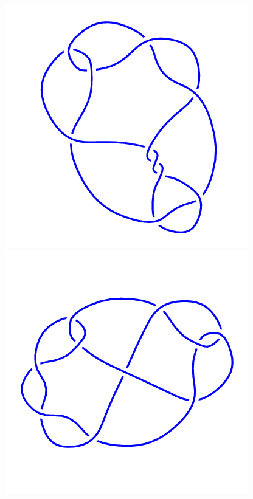 \begin{figure}[H]
    \begin{minipage}[b]{.18\linewidth}
        \centering
        \includegraphics[width=\linewidth]{../data/10_37.png}
    \end{minipage}
    \begin{minipage}[b]{.18\linewidth}
        \centering
        \includegraphics[width=\linewidth]{../data/10_38.png}

\end{minipage}
\end{figure}
